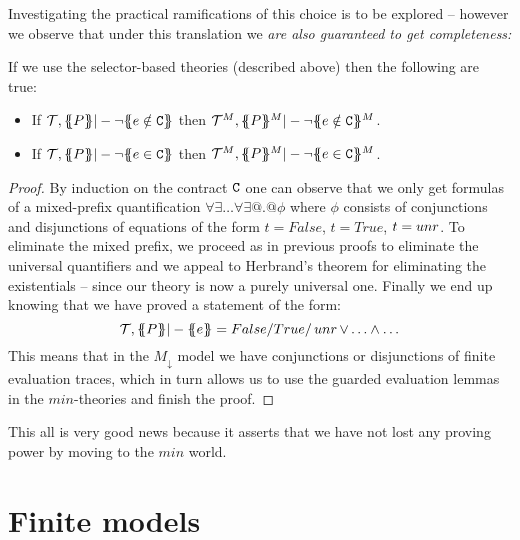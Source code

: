 \documentclass[preprint]{sigplanconf}
\begin{document}
Investigating the practical ramifications of this choice is to be 
explored -- however we observe  that under this translation 
we {\em are also guaranteed to get completeness:}

\begin{theorem}[Completeness]
If we use the selector-based theories (described above) then the following are true:
\begin{itemize}
  \item If $\Th,\ptrans{}{P} |- \neg \ctrans{}{}{e \notin \Ct}$ then 
           $\Th^M,\ptrans{}{P}^M |- \neg \ctrans{}{}{e \notin \Ct}^M$.
  \item If $\Th,\ptrans{}{P} |- \neg \ctrans{}{}{e \in \Ct}$ then 
           $\Th^M,\ptrans{}{P}^M |- \neg \ctrans{}{}{e \in \Ct}^M$.
\end{itemize}
\end{theorem}
\begin{proof}
 By induction on 
the contract ${\tt C}$ one can observe that we only get formulas of a
mixed-prefix quantification $\forall\exists\ldots\forall\exists @.@
\phi$ where $\phi$ consists of conjunctions and disjunctions of
equations of the form $t = False$, $t = True$, $t = \mathop{unr}$. To
eliminate the mixed prefix, we proceed as in previous proofs to
eliminate the universal quantifiers and we appeal to Herbrand's
theorem for eliminating the existentials -- since our theory is now a
purely universal one. Finally we end up knowing that we have proved a
statement of the form:
\[     \Th,\ptrans{}{P} |- \etrans{}{}{e} = False/True/\unr \lor \ldots \land \ldots \]
This means that in the $M_\downarrow$ model we have conjunctions or
disjunctions of finite evaluation traces, which in turn allows us to
use the guarded evaluation lemmas in the $min$-theories and finish the proof.
\end{proof}


This all is very good news because it asserts that we have 
not lost any proving power by moving to the $min$ world.


\section{Finite models}\label{sect:fin-mods}
\newcommand{\Univ}{{\cal U}}
\newcommand{\redop}{\longrightarrow^{\star}}
\end{document}
